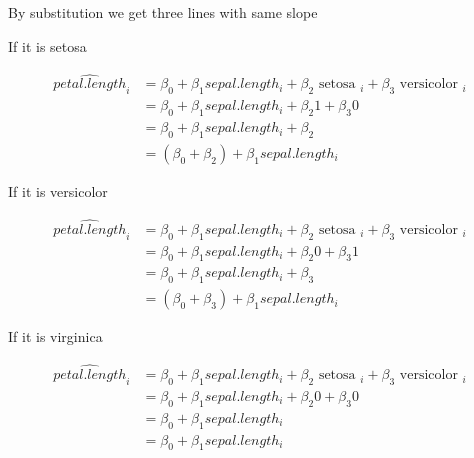\documentclass[australian,ignorenonframetext,aspectratio=169]{beamer}
\begin{document}
\begin{frame}{By substitution we get three lines with same slope}
\protect\hypertarget{by-substitution-we-get-three-lines-with-same-slope}{}

\tiny

\begin{block}{If it is setosa}

\[
\begin{aligned}
\widehat{petal.length}_i &= \beta_0 + \beta_1 sepal.length_i + \beta_2 \text { setosa }_i + \beta_3 \text { versicolor }_i \\
&= \beta_0 + \beta_1 sepal.length_i + \beta_2 1 + \beta_3 0 \\
&= \beta_0 + \beta_1 sepal.length_i + \beta_2 \\
&= (\beta_0 + \beta_2) + \beta_1 sepal.length_i
\end{aligned}
\]

\end{block}

\begin{block}{If it is versicolor}

\[
\begin{aligned}
\widehat{petal.length}_i &= \beta_0 + \beta_1 sepal.length_i + \beta_2 \text { setosa }_i + \beta_3 \text { versicolor }_i \\
&= \beta_0 + \beta_1 sepal.length_i + \beta_2 0 + \beta_3 1 \\
&= \beta_0 + \beta_1 sepal.length_i + \beta_3 \\
&= (\beta_0 + \beta_3) + \beta_1 sepal.length_i
\end{aligned}
\]

\end{block}

\begin{block}{If it is virginica}

\[
\begin{aligned}
\widehat{petal.length}_i &= \beta_0 + \beta_1 sepal.length_i + \beta_2 \text { setosa }_i + \beta_3 \text { versicolor }_i \\
&= \beta_0 + \beta_1 sepal.length_i + \beta_2 0 + \beta_3 0 \\
&= \beta_0 + \beta_1 sepal.length_i \\
&= \beta_0 + \beta_1 sepal.length_i
\end{aligned}
\]

\end{block}

\end{frame}
\end{document}
